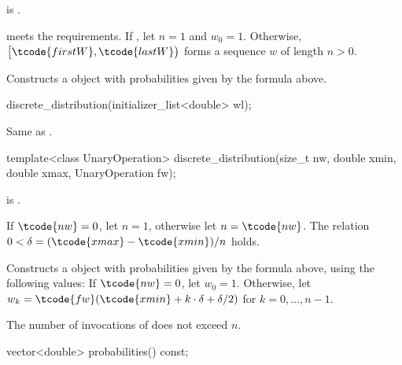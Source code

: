 \begin{itemdescr}
\pnum
\mandates
{} is .

\pnum
\expects
   meets the
   requirements.
 If ,
 let $n = 1$ and $w_0 = 1$.
 Otherwise,
 $\bigl[\tcode{firstW}, \tcode{lastW}\bigr)$
 forms a sequence $w$ of length $n > 0$.

\pnum
\effects
Constructs a  object
with probabilities given by the formula above.
\end{itemdescr}


%
\begin{itemdecl}
discrete_distribution(initializer_list<double> wl);
\end{itemdecl}

\begin{itemdescr}
\pnum
\effects
 Same as .
\end{itemdescr}

\begin{itemdecl}
template<class UnaryOperation>
  discrete_distribution(size_t nw, double xmin, double xmax, UnaryOperation fw);
\end{itemdecl}

\begin{itemdescr}
\pnum
\mandates
{} is .

\pnum
\expects
 If $\tcode{nw} = 0$, let $n = 1$, otherwise let $n = \tcode{nw}$.
 The relation
   $0 < \delta = (\tcode{xmax} - \tcode{xmin}) / n$
 holds.

\pnum
\effects
Constructs a  object
 with probabilities given by the formula above,
 using the following values:
 If $\tcode{nw} = 0$,
 let $w_0 = 1$.
 Otherwise,
 let $w_k = \tcode{fw}(\tcode{xmin} + k \cdot \delta + \delta / 2)$
 for $k = 0, \dotsc, n - 1$.

\pnum
\complexity
The number of invocations of  does not exceed $n$.
\end{itemdescr}

%
\begin{itemdecl}
vector<double> probabilities() const;
\end{itemdecl}

